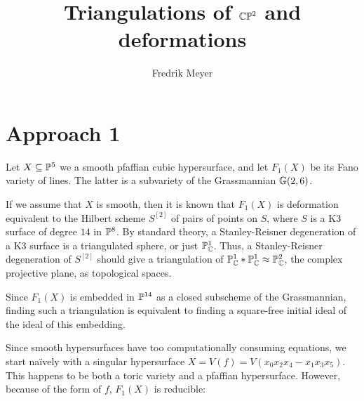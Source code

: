\documentclass[11pt, english]{article}
\begin{document}
\title{Triangulations of $\mathbb{C} \mathbb{P}^2$ and deformations}
\author{Fredrik Meyer}
\maketitle 

\section{Approach 1}

Let $X \subseteq \mathbb{P}^5$ we a smooth pfaffian cubic hypersurface, and let $F_1(X)$ be its Fano variety of lines. The latter is a subvariety of the Grassmannian $\mathbb{G}(2,6)$.

If we assume that $X$ is smooth, then it is known \cite{cp2_beauville} that $F_1(X)$ is deformation equivalent to the Hilbert scheme $S^{[2]}$ of pairs of points on $S$, where $S$ is a K3 surface of degree $14$ in $\mathbb{P}^8$. By standard theory, a Stanley-Reisner degeneration of a K3 surface is a triangulated sphere, or just $\mathbb{P}_{\mathbb{C}}^1$. Thus, a Stanley-Reisner degeneration of $S^{[2]}$ should give a triangulation of  $\mathbb{P}^1_{\mathbb{C}} \ast \mathbb{P}_{\mathbb{C}}^1 \approx \mathbb{P}^2_{\mathbb{C}}$, the complex projective plane, as topological spaces.

Since $F_1(X)$ is embedded in $\mathbb{P}^{14}$ as a closed subscheme of the Grassmannian, finding such a triangulation is equivalent to finding a square-free initial ideal of the ideal of this embedding. 

Since smooth hypersurfaces have too computationally consuming equations, we start naïvely with a singular hypersurface $X =V(f)= V(x_0x_2x_4-x_1x_3x_5)$. This happens to be both a toric variety and a pfaffian hypersurface. However, because of the form of $f$, $F_1(X)$ is reducible:
\end{document}
